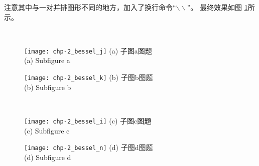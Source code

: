 注意其中与一对并排图形不同的地方，加入了换行命令“$\backslash\backslash$”。
最终效果如图 \ref{fig-bessel-function}所示。
\begin{figure}[htbp!]
\centering\small
\subfigure{\label{subfigure11}}\addtocounter{subfigure}{-2}
\subfigure{\label{subfigure22}}\addtocounter{subfigure}{-2}
\\[-1.5em]%
\subfigure{\label{subfigure3}}\addtocounter{subfigure}{-2}
\subfigure{\label{subfigure4}}\addtocounter{subfigure}{-2}
\end{figure}
\begin{figure}[hptb!]
  \centering\small
  \begin{minipage}[t]{0.5\linewidth}
    \centering
    \texttt{[image: chp-2\_bessel\_j]}
    (a) 子图a图题\\[0.3em]
    (a) Subfigure a
  \end{minipage}%
  \begin{minipage}[t]{0.5\textwidth}
    \centering
    \texttt{[image: chp-2\_bessel\_k]}
    (b) 子图b图题\\[0.3em]
    (b) Subfigure b
  \end{minipage}  \\
  \begin{minipage}[t]{0.5\textwidth}
    \centering
    \texttt{[image: chp-2\_bessel\_i]}
    (c) 子图c图题\\[0.3em]
    (c) Subfigure c
  \end{minipage}%
  \begin{minipage}[t]{0.5\textwidth}
    \centering
    \texttt{[image: chp-2\_bessel\_n]}
    (d) 子图d图题\\[0.3em]
    (d) Subfigure d
  \end{minipage}
   \label{fig-bessel-function}
\end{figure}

